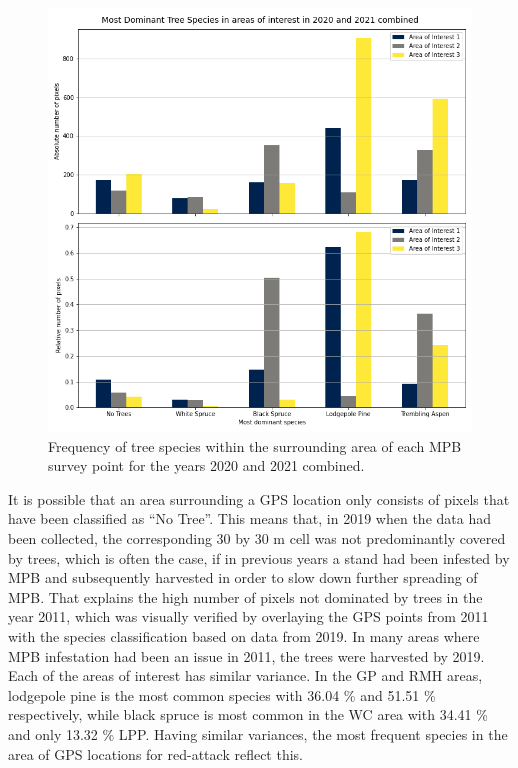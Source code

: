 \documentclass[
]{article}
\begin{document}
\begin{figure}

{\centering \includegraphics[width=0.8\linewidth]{../graphics/freq_species_20_21} 

}

\caption{Frequency of tree species within the surrounding area of each MPB survey point for the years 2020 and 2021 combined.}\label{fig:freqSpecies20-21}
\end{figure}

It is possible that an area surrounding a GPS location only consists of pixels that have been classified as ``No Tree''. This means that, in 2019 when the data had been collected, the corresponding 30 by 30 m cell was not predominantly covered by trees, which is often the case, if in previous years a stand had been infested by MPB and subsequently harvested in order to slow down further spreading of MPB. That explains the high number of pixels not dominated by trees in the year 2011, which was visually verified by overlaying the GPS points from 2011 with the species classification based on data from 2019. In many areas where MPB infestation had been an issue in 2011, the trees were harvested by 2019. Each of the areas of interest has similar variance. In the GP and RMH areas, lodgepole pine is the most common species with 36.04 \% and 51.51 \% respectively, while black spruce is most common in the WC area with 34.41 \% and only 13.32 \% LPP. Having similar variances, the most frequent species in the area of GPS locations for red-attack reflect this.
\end{document}
